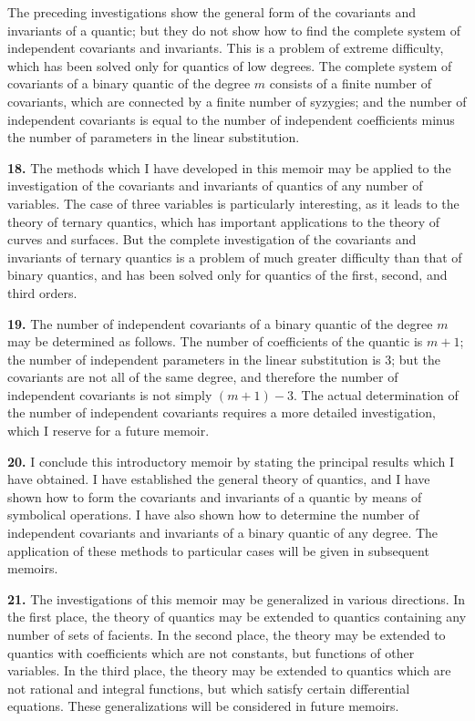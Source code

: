 \documentclass[11pt,a4paper]{book}
\begin{document}
The preceding investigations show the general form of the covariants and invariants of a quantic; but they do not show how to find the complete system of independent covariants and invariants. This is a problem of extreme difficulty, which has been solved only for quantics of low degrees. The complete system of covariants of a binary quantic of the degree $m$ consists of a finite number of covariants, which are connected by a finite number of syzygies; and the number of independent covariants is equal to the number of independent coefficients minus the number of parameters in the linear substitution.

\textbf{18.} The methods which I have developed in this memoir may be applied to the investigation of the covariants and invariants of quantics of any number of variables. The case of three variables is particularly interesting, as it leads to the theory of ternary quantics, which has important applications to the theory of curves and surfaces. But the complete investigation of the covariants and invariants of ternary quantics is a problem of much greater difficulty than that of binary quantics, and has been solved only for quantics of the first, second, and third orders.

\newpage
\setcounter{page}{232}

\textbf{19.} The number of independent covariants of a binary quantic of the degree $m$ may be determined as follows. The number of coefficients of the quantic is $m+1$; the number of independent parameters in the linear substitution is 3; but the covariants are not all of the same degree, and therefore the number of independent covariants is not simply $(m+1) - 3$. The actual determination of the number of independent covariants requires a more detailed investigation, which I reserve for a future memoir.

\textbf{20.} I conclude this introductory memoir by stating the principal results which I have obtained. I have established the general theory of quantics, and I have shown how to form the covariants and invariants of a quantic by means of symbolical operations. I have also shown how to determine the number of independent covariants and invariants of a binary quantic of any degree. The application of these methods to particular cases will be given in subsequent memoirs.

\newpage
\setcounter{page}{233}

\textbf{21.} The investigations of this memoir may be generalized in various directions. In the first place, the theory of quantics may be extended to quantics containing any number of sets of facients. In the second place, the theory may be extended to quantics with coefficients which are not constants, but functions of other variables. In the third place, the theory may be extended to quantics which are not rational and integral functions, but which satisfy certain differential equations. These generalizations will be considered in future memoirs.
\end{document}
